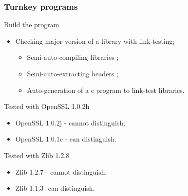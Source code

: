 \documentclass[11pt]{beamer}
\begin{document}
\begin{frame}
    \frametitle{Turnkey programs} 
    \begin{block}{Build the program}
        \begin{itemize}
        	\item Checking major version of a library with link-testing;
        	\begin{itemize}
	            \item Semi-auto-compiling libraries ;
	            \item Semi-auto-extracting headers ;
    	        \item Auto-generation of a c program to link-test libraries.
        	
        	\end{itemize}
        \end{itemize}
    \end{block}

    \begin{block}{Tested with OpenSSL 1.0.2h}
        \begin{itemize}
            \item OpenSSL 1.0.2j - cannot distinguish; 
            \item OpenSSL 1.0.1e - can distinguish.
        \end{itemize}
    \end{block}

    \begin{block}{Tested with Zlib 1.2.8}
        \begin{itemize}
            \item Zlib 1.2.7 - cannot distinguish; 
            \item Zlib 1.1.3- can distinguish.
        \end{itemize}
    \end{block}

\end{frame}
\end{document}
